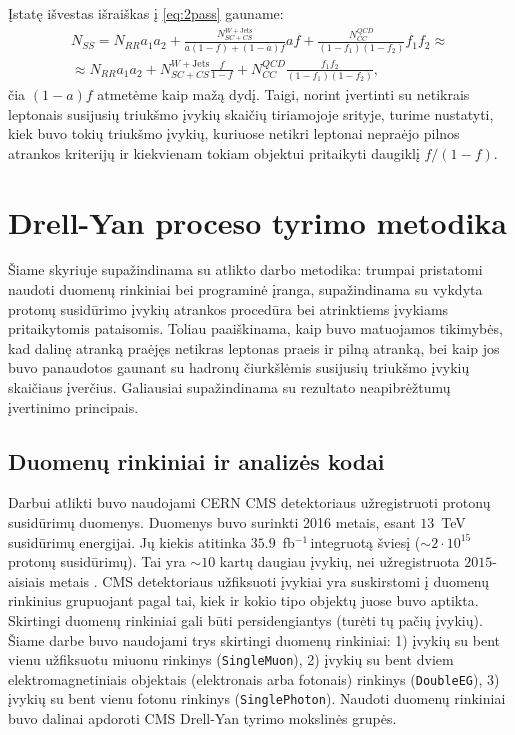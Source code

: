 \documentclass[a4paper, 12pt, oneside]{article}
\newcommand{\ttt}[1]{\texttt{#1}}
\newcommand{\WJets}{W\! +\!\mathrm{Jets}}
\newcommand{\invfb}{fb$^{-1}\,$}
\newcommand{\QCD}{QC\! D}
\newlength\q
\begin{document}
Įstatę išvestas išraiškas į \eqref{eq:2pass} gauname:
\begin{equation}
\label{eq:2passFR}
	\begin{gathered}
		N_{SS} = N_{RR} a_1 a_2 + \frac{N_{SC\!+\!CS}^{\WJets}}{a(1-f)+(1-a)f}af +
				    \frac{N_{CC}^{\QCD}}{(1-f_1)(1-f_2)}f_1f_2 \approx \\ \approx
					N_{RR} a_1 a_2 + N_{SC\!+\!CS}^{\WJets} \frac{f}{1-f} +
					N_{CC}^{\QCD} \frac{f_1 f_2}{(1-f_1)(1-f_2)}, 
	\end{gathered}
\end{equation}
čia $(1-a)f$ atmetėme kaip mažą dydį.
Taigi, norint įvertinti su netikrais leptonais susijusių triukšmo įvykių skaičių tiriamojoje srityje,
turime nustatyti, kiek buvo tokių triukšmo įvykių, kuriuose netikri leptonai nepraėjo pilnos atrankos
kriterijų ir kiekvienam tokiam objektui pritaikyti daugiklį $f/(1-f)$.


\newpage
\section{Drell-Yan proceso tyrimo metodika}
Šiame skyriuje supažindinama su atlikto darbo metodika: trumpai pristatomi naudoti duomenų rinkiniai bei programinė įranga,
supažindinama su vykdyta protonų susidūrimo įvykių atrankos procedūra bei atrinktiems įvykiams pritaikytomis pataisomis.
Toliau paaiškinama, kaip buvo matuojamos tikimybės, kad dalinę atranką praėjęs netikras leptonas praeis ir pilną atranką,
bei kaip jos buvo panaudotos gaunant su hadronų čiurkšlėmis susijusių triukšmo įvykių skaičiaus įverčius.
Galiausiai supažindinama su rezultato neapibrėžtumų įvertinimo principais.


\subsection{Duomenų rinkiniai ir analizės kodai}\label{sec:data}
Darbui atlikti buvo naudojami CERN CMS detektoriaus užregistruoti protonų susidūrimų duomenys.
Duomenys buvo surinkti 2016 metais, esant $13$~TeV susidūrimų energijai.
Jų kiekis atitinka $35.9$~\invfb integruotą šviesį ($\sim\!2 \cdot 10^{15}$ protonų susidūrimų).
Tai yra $\sim\!10$ kartų daugiau įvykių, nei užregistruota $2015$-aisiais metais \cite{DY_CMS2019}.
CMS detektoriaus užfiksuoti įvykiai yra suskirstomi į duomenų rinkinius grupuojant pagal tai,
kiek ir kokio tipo objektų juose buvo aptikta.
Skirtingi duomenų rinkiniai gali būti persidengiantys (turėti tų pačių įvykių).
Šiame darbe buvo naudojami trys skirtingi duomenų rinkiniai:
1) įvykių su bent vienu užfiksuotu miuonu rinkinys (\ttt{SingleMuon}),
2) įvykių su bent dviem elektromagnetiniais objektais (elektronais arba fotonais) rinkinys (\ttt{DoubleEG}),
3) įvykių su bent vienu fotonu rinkinys (\ttt{SinglePhoton}).
Naudoti duomenų rinkiniai buvo dalinai apdoroti CMS Drell-Yan tyrimo mokslinės grupės.
\end{document}
